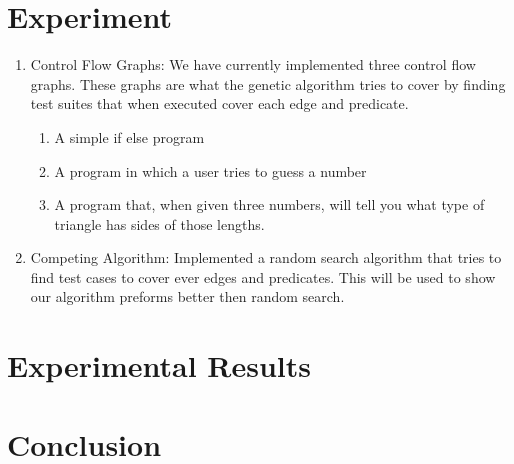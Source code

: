 \documentclass[runningheads]{llncs}
\begin{document}
\section{Experiment}

		\begin{enumerate}	
			\item Control Flow Graphs: We have currently implemented three control flow graphs. These graphs are what the genetic algorithm tries to cover by finding test suites that when executed cover each edge and predicate.
			\begin{enumerate}
				\item A simple if else program
				\item A program in which a user tries to guess a number
				\item A program that, when given three numbers, will tell you what type of triangle has sides of those lengths.
			\end{enumerate}
			
			\item Competing Algorithm: Implemented a random search algorithm that tries to find test cases to cover ever edges and predicates. This will be used to show our algorithm preforms better then random search.
		\end{enumerate} 
		
\section{Experimental Results}

\section{Conclusion}
\end{document}
